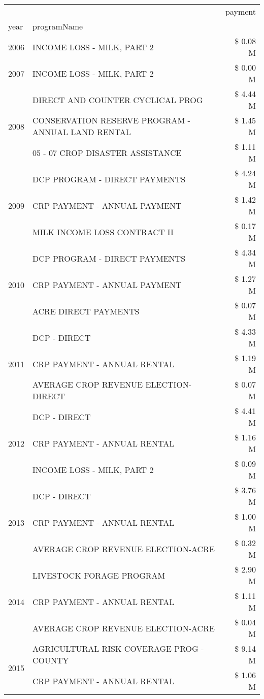 \begin{tabular}{llr}
\toprule
 &  & payment \\
year & programName &  \\
\midrule
2006 & INCOME LOSS - MILK, PART 2 & \$ 0.08 M \\
\cline{1-3}
2007 & INCOME LOSS - MILK, PART 2 & \$ 0.00 M \\
\cline{1-3}
\multirow[t]{3}{*}{2008} & DIRECT AND COUNTER CYCLICAL PROG & \$ 4.44 M \\
 & CONSERVATION RESERVE PROGRAM - ANNUAL LAND RENTAL & \$ 1.45 M \\
 & 05 - 07 CROP DISASTER ASSISTANCE & \$ 1.11 M \\
\cline{1-3}
\multirow[t]{3}{*}{2009} & DCP PROGRAM - DIRECT PAYMENTS & \$ 4.24 M \\
 & CRP PAYMENT - ANNUAL PAYMENT & \$ 1.42 M \\
 & MILK INCOME LOSS CONTRACT II & \$ 0.17 M \\
\cline{1-3}
\multirow[t]{3}{*}{2010} & DCP PROGRAM - DIRECT PAYMENTS & \$ 4.34 M \\
 & CRP PAYMENT - ANNUAL PAYMENT & \$ 1.27 M \\
 & ACRE DIRECT PAYMENTS & \$ 0.07 M \\
\cline{1-3}
\multirow[t]{3}{*}{2011} & DCP - DIRECT & \$ 4.33 M \\
 & CRP PAYMENT - ANNUAL RENTAL & \$ 1.19 M \\
 & AVERAGE CROP REVENUE ELECTION-DIRECT & \$ 0.07 M \\
\cline{1-3}
\multirow[t]{3}{*}{2012} & DCP - DIRECT & \$ 4.41 M \\
 & CRP PAYMENT - ANNUAL RENTAL & \$ 1.16 M \\
 & INCOME LOSS - MILK, PART 2 & \$ 0.09 M \\
\cline{1-3}
\multirow[t]{3}{*}{2013} & DCP - DIRECT & \$ 3.76 M \\
 & CRP PAYMENT - ANNUAL RENTAL & \$ 1.00 M \\
 & AVERAGE CROP REVENUE ELECTION-ACRE & \$ 0.32 M \\
\cline{1-3}
\multirow[t]{3}{*}{2014} & LIVESTOCK FORAGE PROGRAM & \$ 2.90 M \\
 & CRP PAYMENT - ANNUAL RENTAL & \$ 1.11 M \\
 & AVERAGE CROP REVENUE ELECTION-ACRE & \$ 0.04 M \\
\cline{1-3}
\multirow[t]{3}{*}{2015} & AGRICULTURAL RISK COVERAGE PROG - COUNTY & \$ 9.14 M \\
 & CRP PAYMENT - ANNUAL RENTAL & \$ 1.06 M \\

\end{tabular}
